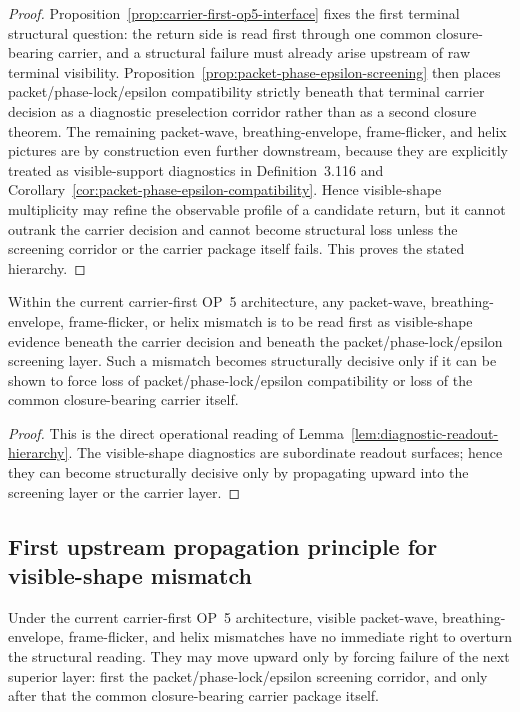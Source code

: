 \begin{proof}
Proposition~\ref{prop:carrier-first-op5-interface} fixes the first terminal structural question: the return side is read first through one common closure-bearing carrier, and a structural failure must already arise upstream of raw terminal visibility. Proposition~\ref{prop:packet-phase-epsilon-screening} then places packet/phase-lock/epsilon compatibility strictly beneath that terminal carrier decision as a diagnostic preselection corridor rather than as a second closure theorem. The remaining packet-wave, breathing-envelope, frame-flicker, and helix pictures are by construction even further downstream, because they are explicitly treated as visible-support diagnostics in Definition~3.116 and Corollary~\ref{cor:packet-phase-epsilon-compatibility}. Hence visible-shape multiplicity may refine the observable profile of a candidate return, but it cannot outrank the carrier decision and cannot become structural loss unless the screening corridor or the carrier package itself fails. This proves the stated hierarchy.
\end{proof}

\begin{corollary}
\label{cor:flicker-helix-subordination}
Within the current carrier-first OP~5 architecture, any packet-wave, breathing-envelope, frame-flicker, or helix mismatch is to be read first as visible-shape evidence beneath the carrier decision and beneath the packet/phase-lock/epsilon screening layer. Such a mismatch becomes structurally decisive only if it can be shown to force loss of packet/phase-lock/epsilon compatibility or loss of the common closure-bearing carrier itself.
\end{corollary}

\begin{proof}
This is the direct operational reading of Lemma~\ref{lem:diagnostic-readout-hierarchy}. The visible-shape diagnostics are subordinate readout surfaces; hence they can become structurally decisive only by propagating upward into the screening layer or the carrier layer.
\end{proof}

\subsection{First upstream propagation principle for visible-shape mismatch}
\label{sec:first-upstream-propagation}

\begin{remark}
Under the current carrier-first OP~5 architecture, visible packet-wave, breathing-envelope, frame-flicker, and helix mismatches have no immediate right to overturn the structural reading. They may move upward only by forcing failure of the next superior layer: first the packet/phase-lock/epsilon screening corridor, and only after that the common closure-bearing carrier package itself.
\end{remark}


